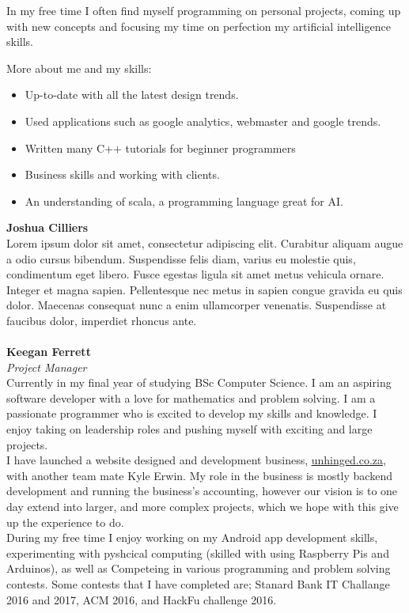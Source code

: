 	In my free time I often find myself programming on personal projects, coming up with new concepts and focusing my time on perfection my artificial intelligence skills. 

	\noindent
	More about me and my skills:
    \begin{itemize}
        \item Up-to-date with all the latest design trends.
        \item Used applications such as google analytics, webmaster and google trends. 
        \item Written many C++ tutorials for beginner programmers
        \item Business skills and working with clients. 
        \item An understanding of scala, a programming language great for AI. 
    \end{itemize}
    
\textbf{Joshua Cilliers}\\
Lorem ipsum dolor sit amet, consectetur adipiscing elit. Curabitur aliquam augue a odio cursus bibendum. Suspendisse felis diam, varius eu molestie quis, condimentum eget libero. Fusce egestas ligula sit amet metus vehicula ornare. Integer et magna sapien. Pellentesque nec metus in sapien congue gravida eu quis dolor. Maecenas consequat nunc a enim ullamcorper venenatis. Suspendisse at faucibus dolor, imperdiet rhoncus ante. \\ \\

\textbf{Keegan Ferrett}\\
\textit{Project Manager}\\
    Currently in my final year of studying BSc Computer Science. I am an aspiring software developer with a love for mathematics and problem solving. I am a passionate programmer who is excited to develop my skills and knowledge. I enjoy taking on leadership roles and pushing myself with exciting and large projects. \\

    I have launched a website designed and development business, \href{www.unhinged.co.za}{\underline{unhinged.co.za}}, with another team mate Kyle Erwin. My role in the business is mostly backend development and running the business's accounting, however our vision is to one day extend into larger, and more complex projects, which we hope with this give up the experience to do.\\

    During my free time I enjoy working on my Android app development skills, experimenting with pyshcical computing (skilled with using Raspberry Pis and Arduinos), as well as Competeing in various programming and problem solving contests. Some contests that I have completed are; Stanard Bank IT Challange 2016 and 2017, ACM 2016, and HackFu challenge 2016.\\

